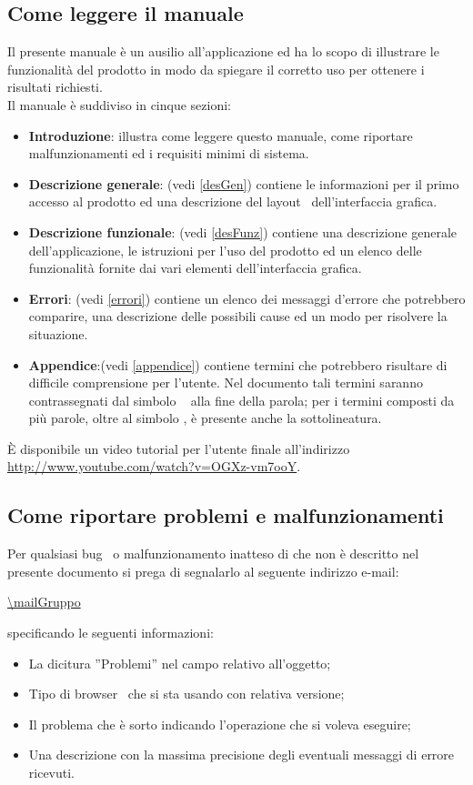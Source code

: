 {\subsection{Come leggere il manuale}{
Il presente manuale è un ausilio all'applicazione ed ha lo scopo di illustrare le funzionalità del prodotto in modo da spiegare il corretto uso per ottenere i risultati richiesti.\\
Il manuale è suddiviso in cinque sezioni:
\begin{itemize}
	\item {\textbf{Introduzione}: illustra come leggere questo manuale, come riportare malfunzionamenti ed i requisiti minimi di sistema.
	}
	\item {\textbf{Descrizione generale}: (vedi \ref{desGen}) contiene le informazioni per il primo accesso al prodotto ed una descrizione del layout\g~ dell'interfaccia grafica.
	}
	\item {\textbf{Descrizione funzionale}: (vedi \ref{desFunz})  contiene una descrizione generale dell'applicazione, le istruzioni per l'uso del prodotto ed un elenco delle funzionalità fornite dai vari elementi dell'interfaccia grafica.
	}
	\item {\textbf{Errori}: (vedi \ref{errori})  contiene un elenco dei messaggi d'errore che potrebbero comparire, una descrizione delle possibili cause ed un modo per risolvere la situazione.
	}
	\item {\textbf{Appendice}:(vedi \ref{appendice})   contiene termini che potrebbero risultare di difficile comprensione per l'utente. Nel documento tali termini saranno contrassegnati dal simbolo \g~ alla fine della parola; per i termini composti da più parole, oltre al simbolo \g , è presente anche la sottolineatura.

	}
\end{itemize}
\`E disponibile un video tutorial per l'utente finale all'indirizzo \url{http://www.youtube.com/watch?v=OGXz-vm7ooY}.
}

\subsection{Come riportare problemi e malfunzionamenti}{
Per qualsiasi bug\g~ o malfunzionamento inatteso di \textbf{\mytalk} che non è descritto nel presente documento si prega di segnalarlo al seguente indirizzo e-mail:
\begin{center}
	\url{\mailGruppo}
\end{center}
specificando le seguenti informazioni:
\begin{itemize}
	\item La dicitura ''Problemi'' nel campo relativo all'oggetto;
	\item Tipo di browser\g~ che si sta usando con relativa versione;
	\item Il problema che è sorto indicando l'operazione che si voleva eseguire;
	\item Una descrizione con la massima precisione degli eventuali messaggi di errore ricevuti.
\end{itemize}
}

}
